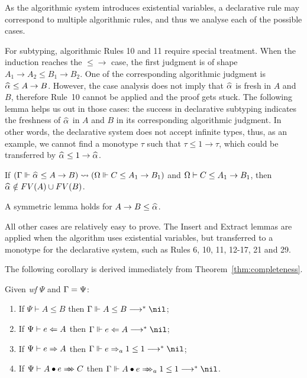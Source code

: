 As the algorithmic system introduces existential variables,
a declarative rule may correspond to multiple algorithmic rules,
and thus we analyse each of the possible cases.

For subtyping, algorithmic Rules 10 and 11 require special treatment.
When the induction reaches the $\mathtt{{\le}{\to}}$ case,
the first judgment is of shape $A_1 \to A_2 \le B_1 \to B_2$.
One of the corresponding algorithmic judgment is $\al \le A \to B$.
However, the case analysis does not imply that $\al$ is fresh in $A$ and $B$,
therefore Rule~10 cannot be applied and the proof gets stuck.
The following lemma helps us out in those cases:
the success in declarative subtyping indicates the freshness of $\al$ in $A$ and $B$
in its corresponding algorithmic judgment.
In other words, the declarative system does not accept infinite types,
thus, as an example, we cannot find a monotype $\tau$ such that $\tau\le 1\to \tau$,
which could be transferred by $\al\le 1\to\al$.

\begin{lemma}
If $(\Gm \Vdash \al \le A \to B) \sto (\Om \Vdash C \le A_1 \to B_1)$ and
$\Omega \vdash C \le A_1 \to B_1$, then $\al\notin FV(A) \cup FV(B)$.
\end{lemma}
A symmetric lemma holds for $A\to B \le \al$.

All other cases are relatively easy to prove.
The Insert and Extract lemmas are applied when the algorithm uses existential variables,
but transferred to a monotype for the declarative system,
such as Rules 6, 10, 11, 12-17, 21 and 29.

The following corollary is derived immediately from Theorem~\ref{thm:completeness}.
\begin{corollary}
Given \emph{wf }$\Psi$ and $\Gamma = \Psi$:
\begin{enumerate}
    \item If $\Psi \vdash A \le B$ then $\Gm \Vdash A \le B \redto \nil$;
    \item If $\Psi \vdash e \Leftarrow A$ then $\Gm \Vdash e \Lto A \redto \nil$;
    \item If $\Psi \vdash e \Rightarrow A$ then $\Gm \Vdash e \To_a 1 \le 1 \redto \nil$;
    \item If $\Psi \vdash \appInf{A}{e}{C}$ then $\Gm \Vdash \appInfAlg{A}{e}[a][1 \le 1] \redto \nil$.
\end{enumerate}
\end{corollary}

